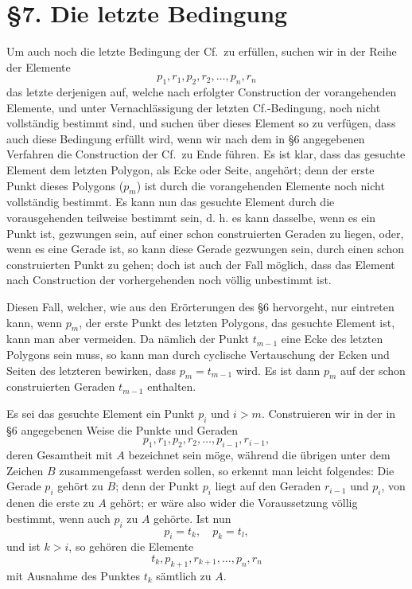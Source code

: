 \documentclass[11pt]{article}
\newcommand{\Cf}{\textup{Cf.}}
\begin{document}
\section*{\S 7. Die letzte Bedingung}
Um auch noch die letzte Bedingung der \Cf\ zu erfüllen, suchen wir in der Reihe der Elemente
\[
p_1,r_1,p_2,r_2,\ldots,p_n,r_n
\]
das letzte derjenigen auf, welche nach erfolgter Construction der vorangehenden Elemente, und unter Vernachlässigung der letzten \Cf-Bedingung, noch nicht vollständig bestimmt sind, und suchen über dieses Element so zu verfügen, dass auch diese Bedingung erfüllt wird, wenn wir nach dem in \S 6 angegebenen Verfahren die Construction der \Cf\ zu Ende führen. Es ist klar, dass das gesuchte Element dem letzten Polygon, als Ecke oder Seite, angehört; denn der erste Punkt dieses Polygons ($p_m$) ist durch die vorangehenden Elemente noch nicht vollständig bestimmt. Es kann nun das gesuchte Element durch die vorausgehenden teilweise bestimmt sein, d. h. es kann dasselbe, wenn es ein Punkt ist, gezwungen sein, auf einer schon construierten Geraden zu liegen, oder, wenn es eine Gerade ist, so kann diese Gerade gezwungen sein, durch einen schon construierten Punkt zu gehen; doch ist auch der Fall möglich, dass das Element nach Construction der vorhergehenden noch völlig unbestimmt ist.

Diesen Fall, welcher, wie aus den Erörterungen des \S 6 hervorgeht, nur eintreten kann, wenn $p_m$, der erste Punkt des letzten Polygons, das gesuchte Element ist, kann man aber vermeiden. Da nämlich der Punkt $t_{m-1}$ eine Ecke des letzten Polygons sein muss, so kann man durch cyclische Vertauschung der Ecken und Seiten des letzteren bewirken, dass $p_m=t_{m-1}$ wird. Es ist dann $p_m$ auf der schon construierten Geraden $t_{m-1}$ enthalten.

Es sei das gesuchte Element ein Punkt $p_i$ und $i>m$. Construieren wir in der in \S 6 angegebenen Weise die Punkte und Geraden
\[
p_1,r_1,p_2,r_2,\ldots,p_{i-1},r_{i-1},
\]
deren Gesamtheit mit $A$ bezeichnet sein möge, während die übrigen unter dem Zeichen $B$ zusammengefasst werden sollen, so erkennt man leicht folgendes: Die Gerade $p_i$ gehört zu $B$; denn der Punkt $p_i$ liegt auf den Geraden $r_{i-1}$ und $p_i$, von denen die erste zu $A$ gehört; er wäre also wider die Voraussetzung völlig bestimmt, wenn auch $p_i$ zu $A$ gehörte. Ist nun
\[
p_i=t_k,\quad p_k=t_l,
\]
und ist $k>i$, so gehören die Elemente
\[
t_k,p_{k+1},r_{k+1},\ldots,p_n,r_n
\]
mit Ausnahme des Punktes $t_k$ sämtlich zu $A$.
\end{document}
